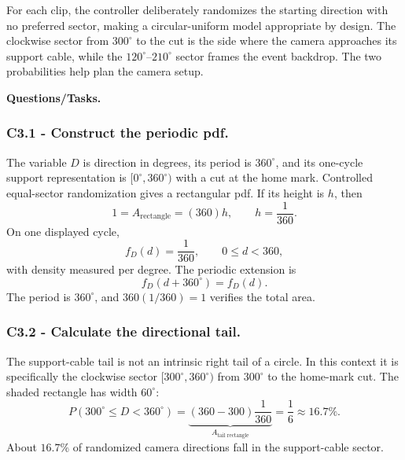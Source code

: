 	For each clip, the controller deliberately randomizes the starting direction
	with no preferred sector, making a circular-uniform model appropriate by
	design.  The clockwise sector from $300^\circ$ to the cut is the side where the
	camera approaches its support cable, while the $120^\circ$--$210^\circ$ sector
	frames the event backdrop.  The two probabilities help plan the camera setup.
	
	\begingroup
	\endgroup
	
	\textbf{Questions/Tasks.}
	\begin{enumerate}
	\end{enumerate}
	
	\subsubsection*{C3.1 - Construct the periodic pdf.}
	\label{subsec:c3-uniform-device-a}
	The variable $D$ is direction in degrees, its period is $360^\circ$, and its
	one-cycle support representation is $[0^\circ,360^\circ)$ with a cut at the
	home mark.
	Controlled equal-sector randomization gives a rectangular pdf.  If its height
	is $h$, then
	\[
	1=A_{\text{rectangle}}=(360)h,
	\qquad h=\frac1{360}.
	\]
	On one displayed cycle,
	\[
	f_D(d)=\frac1{360},\qquad 0\le d<360,
	\]
	with density measured per degree.  The periodic extension is
	\[
	f_D(d+360^\circ)=f_D(d).
	\]
	The period is $360^\circ$, and $360(1/360)=1$ verifies the total area.
	
	\subsubsection*{C3.2 - Calculate the directional tail.}
	\label{subsec:c3-uniform-device-b}
	The support-cable tail is not an intrinsic right tail of a circle.  In this
	context it is specifically the clockwise sector $[300^\circ,360^\circ)$ from
	$300^\circ$ to the home-mark cut.  The shaded rectangle has width $60^\circ$:
	\[
	P(300^\circ\le D<360^\circ)
	=\underbrace{(360-300)\frac1{360}}_{A_{\text{tail rectangle}}}
	=\frac16\approx16.7\%.
	\]
	About $16.7\%$ of randomized camera directions fall in the support-cable
	sector.
	\begingroup
	\endgroup
	

